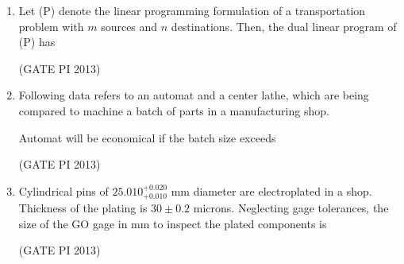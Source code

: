 \documentclass[journal,12pt,onecolumn]{IEEEtran}
\theoremstyle{remark}
\begin{document}
\begin{enumerate}
\item Let (P) denote the linear programming formulation of a transportation problem with $m$ sources and $n$ destinations. Then, the dual linear program of (P) has
\begin{enumerate}
\end{enumerate}

\hfill (GATE PI 2013)

\item Following data refers to an automat and a center lathe, which are being compared to machine a batch of parts in a manufacturing shop.

 

Automat will be economical if the batch size exceeds

\begin{enumerate}
\end{enumerate}

\hfill (GATE PI 2013)

\item Cylindrical pins of $25.010^{+0.020}_{+0.010}$ mm diameter are electroplated in a shop. Thickness of the plating is $30 \pm 0.2$ microns. Neglecting gage tolerances, the size of the GO gage in mm to inspect the plated components is 

\begin{enumerate}
\end{enumerate}

\hfill (GATE PI 2013)


\end{enumerate}
\end{document}
